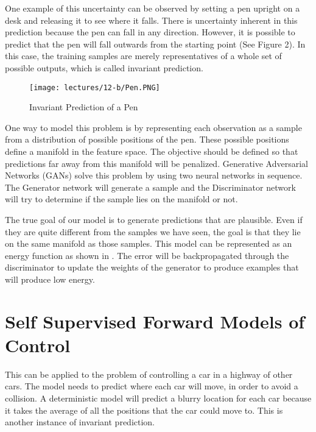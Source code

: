 One example of this uncertainty can be observed by setting a pen upright on a desk and releasing it to see where it falls. There is uncertainty inherent in this prediction because the pen can fall in any direction. However, it is possible to predict that the pen will fall outwards from the starting point (See Figure 2). In this case, the training samples are merely representatives of a whole set of possible outputs, which is called invariant prediction. 

\begin{figure}[h!]
\centering
\texttt{[image: lectures/12-b/Pen.PNG]}
\caption{Invariant Prediction of a Pen}
\label{fig:pen}
\end{figure}

One way to model this problem is by representing each observation as a sample from a  distribution of possible positions of the pen. These possible positions define a manifold in the feature space. The objective should be defined so that predictions far away from this manifold will be penalized. Generative Adversarial Networks (GANs) solve this problem by using two neural networks in sequence. The Generator network will generate a sample and the Discriminator network will try to determine if the sample lies on the manifold or not. 

The true goal of our model is to generate predictions that are plausible. Even if they are quite different from the samples we have seen, the goal is that they lie on the same manifold as those samples. This model can be represented as an energy function as shown in \cite{zhao2016energy}. The error will be backpropagated through the discriminator to update the weights of the generator to produce examples that will produce low energy.

\section{Self Supervised Forward Models of Control}

This can be applied to the problem of controlling a car in a highway of other cars. The model needs to predict where each car will move, in order to avoid a collision. A deterministic model will predict a blurry location for each car because it takes the average of all the positions that the car could move to. This is another instance of invariant prediction.

